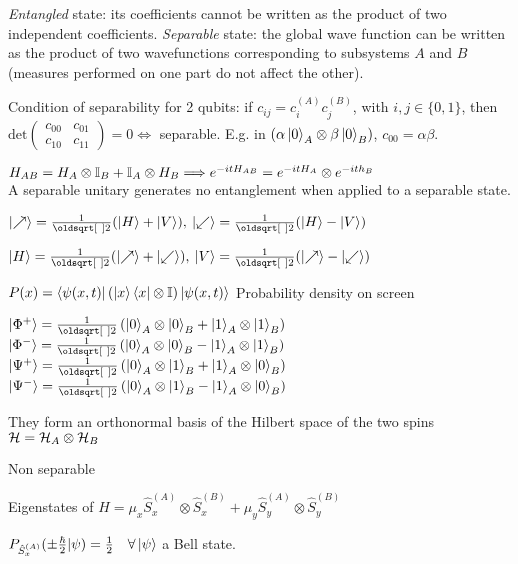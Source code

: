 \begin{squishlist}
    \item \emph{Entangled} state: its coefficients cannot be written as the product of two independent coefficients. 
        \emph{Separable} state: the global wave function can be written as the product of two wavefunctions corresponding to subsystems $A$ and $B$ (measures performed on one part do not affect the other).
    \item Condition of separability for 2 qubits: if $c_{ij} = c^{(A)}_i c^{(B)}_j$, with $i,j\in \{0,1\}$, then
        $\mathrm{det} \begin{pmatrix} c_{00} & c_{01} \\ c_{10} & c_{11} \end{pmatrix} = 0 \Leftrightarrow $ separable. E.g. in $\left(\alpha \ket{0}_A \otimes \beta \ket{0}_B\right)$, $c_{00} = \alpha \beta$.
    \item $H_{AB} = H_A \otimes \mathbb{I}_B + \mathbb{I}_A \otimes H_B \Longrightarrow e^{-itH_{AB}} = e^{-itH_A} \otimes e^{-ith_B}$ \\ A separable unitary generates no entanglement when applied to a separable state.
\end{squishlist}

\columnbreak

\begin{squishlist}
    \item $\ket{\nearrow} = \frac{1}{\sqrt{2}}(\ket{H}+\ket{V}),\: \ket{\swarrow} = \frac{1}{\sqrt{2}}(\ket{H} - \ket{V})$
    \item $\ket{H} = \frac{1}{\sqrt{2}}(\ket{\nearrow} + \ket{\swarrow}),\: \ket{V} = \frac{1}{\sqrt{2}}(\ket{\nearrow} - \ket{\swarrow})$
    \item $P(x) = \braket{\psi(x,t)|\left(\ket{x}\bra{x} \otimes \mathbb{I}\right)| \psi(x,t)}$ Probability density on screen
\end{squishlist}


\begin{squishlist}
    \item $\ket{\Phi^+} = \frac{1}{\sqrt{2}} \left( \ket{0}_A \otimes \ket{0}_B + \ket{1}_A \otimes \ket{1}_B\right)$ \\
          $\ket{\Phi^-} = \frac{1}{\sqrt{2}} \left( \ket{0}_A \otimes \ket{0}_B - \ket{1}_A \otimes \ket{1}_B\right)$ \\
          $\ket{\Psi^+} = \frac{1}{\sqrt{2}} \left( \ket{0}_A \otimes \ket{1}_B + \ket{1}_A \otimes \ket{0}_B\right)$ \\
          $\ket{\Psi^-} = \frac{1}{\sqrt{2}} \left( \ket{0}_A \otimes \ket{1}_B - \ket{1}_A \otimes \ket{0}_B\right)$
    \item They form an orthonormal basis of the Hilbert space of the two spins $\mathcal{H} = \mathcal{H}_A \otimes \mathcal{H}_B$
    \item Non separable
    \item Eigenstates of $\hat{H} = \mu_x \hat{S}_x^{(A)} \otimes \hat{S}_x^{(B)} + \mu_y \hat{S}_y^{(A)} \otimes \hat{S}_y^{(B)}$
    \item $P_{\hat{S}_x^{(A)}}(\pm \frac{\hbar}{2} | \psi) = \frac{1}{2} \quad \forall \ket{\psi} $ a Bell state. 
\end{squishlist}


